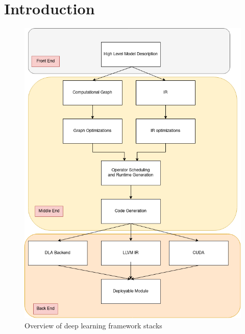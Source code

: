 \chapter{Introduction} %

\label{Chapter1} %
\begin{figure}[th]
\centering
\includegraphics[scale=0.5]{Figures/framework_stack.png}
\decoRule
\caption[dlFramework]{Overview of deep learning framework stacks}
\label{fig:dlFramework}
\end{figure}

